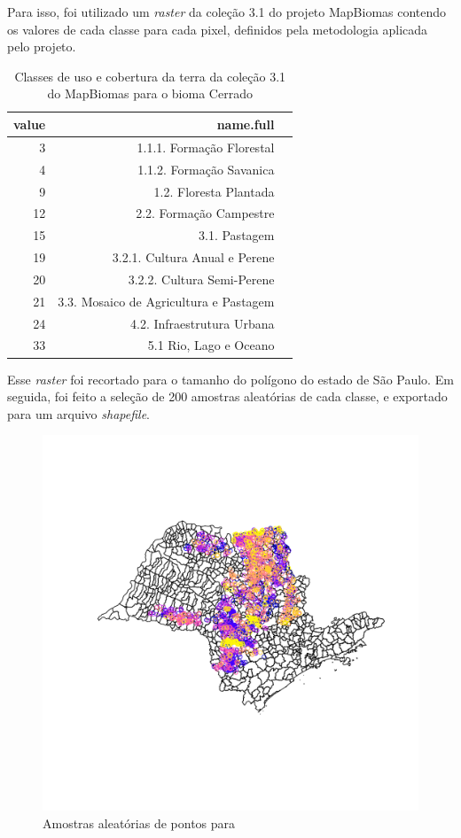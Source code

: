 	Para isso, foi utilizado um \textit{raster} da coleção 3.1 do projeto MapBiomas \cite{mapbiomas2018coleccao} contendo os valores de cada classe para cada pixel, definidos pela metodologia aplicada pelo projeto.

\begin{table}[H]
\centering
\caption{Classes de uso e cobertura da terra da coleção 3.1 do MapBiomas para o bioma Cerrado}
\begin{tabular}{rrl}
  \hline
 value & name.full \\ 
  \hline
 3 &         1.1.1. Formação Florestal \\ 
4 &         1.1.2. Formação Savanica \\ 
   9 &     1.2. Floresta Plantada \\ 
  12 &     2.2. Formação Campestre \\ 
  15 &     3.1. Pastagem \\ 
  19 &          3.2.1. Cultura Anual e Perene \\ 
  20 &          3.2.2. Cultura Semi-Perene \\ 
  21 &     3.3. Mosaico de Agricultura e Pastagem \\ 
  24 &     4.2. Infraestrutura Urbana \\ 
  33 &     5.1 Rio, Lago e Oceano \\ 
   \hline
\end{tabular}
\end{table}

    Esse \emph{raster} foi recortado para o tamanho do polígono do estado
de São Paulo. Em seguida, foi feito a seleção de 200 amostras aleatórias
de cada classe, e exportado para um arquivo \emph{shapefile}.

\begin{figure}[H]
    \centering
    \caption{Amostras aleatórias de pontos para }
    \includegraphics[scale=0.6]{figs/plot_pontos-amostra.pdf}
\end{figure}

